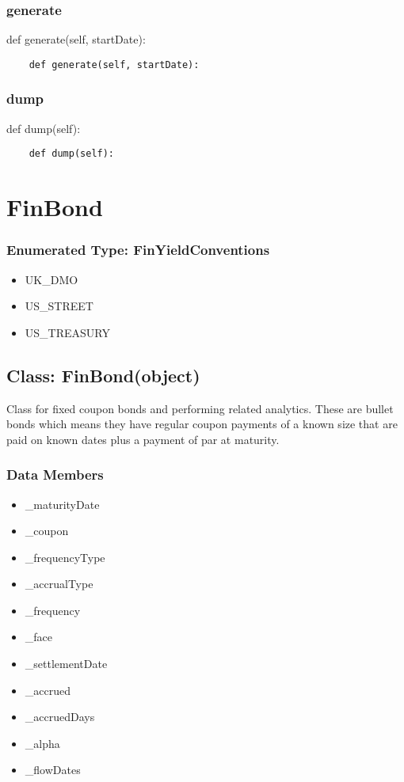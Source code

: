 \documentclass[twoside,11pt]{book}
\begin{document}
\subsubsection*{{\bf generate}}
def generate(self, startDate): 

\begin{lstlisting}
    def generate(self, startDate):
\end{lstlisting}

\subsubsection*{{\bf dump}}
def dump(self): 

\begin{lstlisting}
    def dump(self):
\end{lstlisting}

\newpage
\section{FinBond}

\subsubsection{Enumerated Type: FinYieldConventions}
\begin{itemize}
\item{UK\_DMO}
\item{US\_STREET}
\item{US\_TREASURY}
\end{itemize}

\subsection*{Class: FinBond(object)}
Class for fixed coupon bonds and performing related analytics. These are bullet bonds which means they have regular coupon payments of a known size that are paid on known dates plus a payment of par at maturity. 

\subsubsection*{Data Members}
\begin{itemize}
\item{\_maturityDate}
\item{\_coupon}
\item{\_frequencyType}
\item{\_accrualType}
\item{\_frequency}
\item{\_face}
\item{\_settlementDate}
\item{\_accrued}
\item{\_accruedDays}
\item{\_alpha}
\item{\_flowDates}
\end{itemize}
\end{document}
